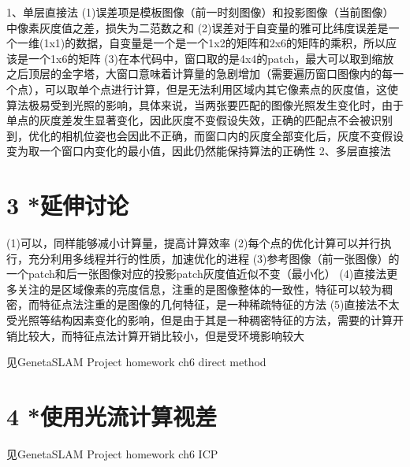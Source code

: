 \documentclass[12pt, a4paper, oneside]{ctexart}
\begin{document}
	1、单层直接法
	(1)误差项是模板图像（前一时刻图像）和投影图像（当前图像）中像素灰度值之差，损失为二范数之和
	(2)误差对于自变量的雅可比纬度误差是一个一维(1x1)的数据，自变量是一个是一个1x2的矩阵和2x6的矩阵的乘积，所以应该是一个1x6的矩阵
	(3)在本代码中，窗口取的是4x4的patch，最大可以取到缩放之后顶层的金字塔，大窗口意味着计算量的急剧增加（需要遍历窗口图像内的每一个点），可以取单个点进行计算，但是无法利用区域内其它像素点的灰度值，这使算法极易受到光照的影响，具体来说，当两张要匹配的图像光照发生变化时，由于单点的灰度差发生显著变化，因此灰度不变假设失效，正确的匹配点不会被识别到，优化的相机位姿也会因此不正确，而窗口内的灰度全部变化后，灰度不变假设变为取一个窗口内变化的最小值，因此仍然能保持算法的正确性
	2、多层直接法
	
	\section{3 *延伸讨论}
	(1)可以，同样能够减小计算量，提高计算效率
	(2)每个点的优化计算可以并行执行，充分利用多线程并行的性质，加速优化的进程
	(3)参考图像（前一张图像）的一个patch和后一张图像对应的投影patch灰度值近似不变（最小化）
	(4)直接法更多关注的是区域像素的亮度信息，注重的是图像整体的一致性，特征可以较为稠密，而特征点法注重的是图像的几何特征，是一种稀疏特征的方法
	(5)直接法不太受光照等结构因素变化的影响，但是由于其是一种稠密特征的方法，需要的计算开销比较大，而特征点法计算开销比较小，但是受环境影响较大
	
	见GenetaSLAM Project homework ch6 direct method
	
	\section{4 *使用光流计算视差}
	
	见GenetaSLAM Project homework ch6 ICP
	
\end{document}

